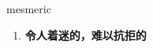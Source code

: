
\begin{frame}
{\huge mesmeric}
\begin{center}
\begin{enumerate}\Large
  \item \textbf{令人着迷的，难以抗拒的}
\end{enumerate}
\end{center}
\end{frame}
